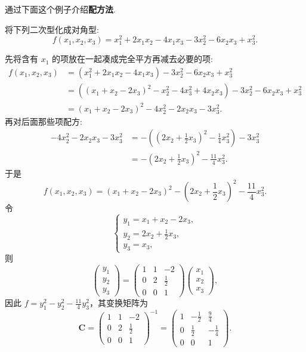 \documentclass[../../main.tex]{subfiles}
\begin{document}
通过下面这个例子介绍\textbf{配方法}.
\begin{example}\label{example:二次型化简配方法例题1}
将下列二次型化成对角型:
\[
f(x_1,x_2,x_3)=x_1^2 + 2x_1x_2 - 4x_1x_3 - 3x_2^2 - 6x_2x_3 + x_3^2.
\]
\end{example}
\begin{solution}
先将含有 $x_1$ 的项放在一起凑成完全平方再减去必要的项:
\begin{align*}
f(x_1,x_2,x_3)&=(x_1^2 + 2x_1x_2 - 4x_1x_3) - 3x_2^2 - 6x_2x_3 + x_3^2\\
&=((x_1 + x_2 - 2x_3)^2 - x_2^2 - 4x_3^2 + 4x_2x_3) - 3x_2^2 - 6x_2x_3 + x_3^2\\
&=(x_1 + x_2 - 2x_3)^2 - 4x_2^2 - 2x_2x_3 - 3x_3^2.
\end{align*}
再对后面那些项配方:
\begin{align*}
-4x_2^2 - 2x_2x_3 - 3x_3^2&=-\left((2x_2 + \frac{1}{2}x_3)^2 - \frac{1}{4}x_3^2\right) - 3x_3^2\\
&=-(2x_2 + \frac{1}{2}x_3)^2 - \frac{11}{4}x_3^2.
\end{align*}
于是
\[
f(x_1,x_2,x_3)=(x_1 + x_2 - 2x_3)^2 - (2x_2 + \frac{1}{2}x_3)^2 - \frac{11}{4}x_3^2.
\]
令
\[
\begin{cases}
y_1 = x_1 + x_2 - 2x_3,\\
y_2 = 2x_2 + \frac{1}{2}x_3,\\
y_3 = x_3,
\end{cases}
\]
则
\[
\begin{pmatrix}
y_1\\
y_2\\
y_3
\end{pmatrix}=
\begin{pmatrix}
1 & 1 & -2\\
0 & 2 & \frac{1}{2}\\
0 & 0 & 1
\end{pmatrix}
\begin{pmatrix}
x_1\\
x_2\\
x_3
\end{pmatrix},
\]
因此 $f = y_1^2 - y_2^2 - \frac{11}{4}y_3^2$，其变换矩阵为
\[
\boldsymbol{C}=
\begin{pmatrix}
1 & 1 & -2\\
0 & 2 & \frac{1}{2}\\
0 & 0 & 1
\end{pmatrix}^{-1}=
\begin{pmatrix}
1 & -\frac{1}{2} & \frac{9}{4}\\
0 & \frac{1}{2} & -\frac{1}{4}\\
0 & 0 & 1
\end{pmatrix}.
\]
\end{solution}
\end{document}
